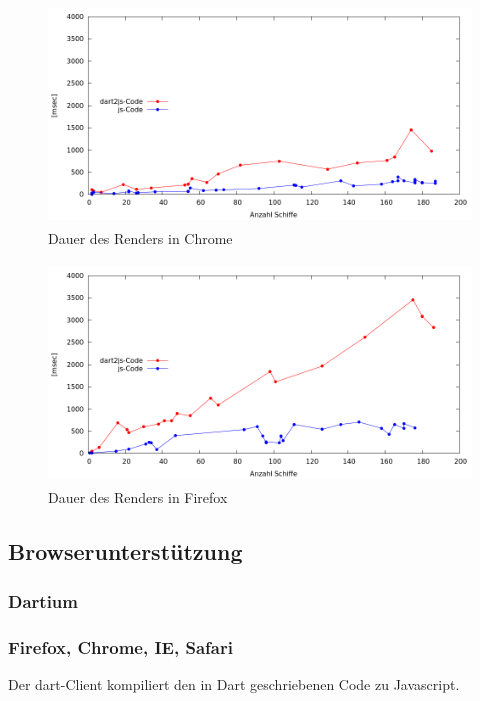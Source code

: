 \begin {figure}[H]
\begin{center}
  \includegraphics[height=2.3in]{images/Chrome.png}
\end{center}
 \caption{Dauer des Renders in Chrome}
\end {figure}


\begin {figure}[H]
\begin{center}
  \includegraphics[height=2.3in]{images/Firefox.png}
\end{center}
 \caption{Dauer des Renders in Firefox}
\end {figure}


\subsection{Browserunterstützung}
\subsubsection{Dartium}

\subsubsection{Firefox, Chrome, IE, Safari}

Der dart-Client kompiliert den in Dart geschriebenen Code zu Javascript.

